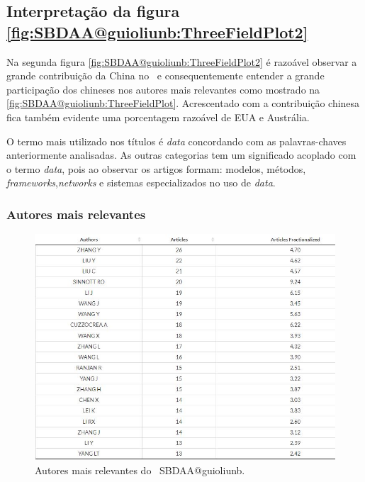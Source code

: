 \subsection{Interpretação da figura \ref{fig:SBDAA@guioliunb:ThreeFieldPlot2}}

Na segunda figura \ref{fig:SBDAA@guioliunb:ThreeFieldPlot2} é razoável  observar a grande contribuição da China no \dataset\ e consequentemente entender a grande participação dos chineses nos autores mais relevantes como mostrado na \ref{fig:SBDAA@guioliunb:ThreeFieldPlot}. Acrescentado com a contribuição chinesa fica também evidente uma porcentagem razoável de EUA e Austrália.

O termo mais utilizado nos títulos é \textit{data} concordando com as palavras-chaves anteriormente analisadas. As outras categorias tem um significado acoplado com o termo \textit{data}, pois ao observar os artigos formam: modelos, métodos, \textit{frameworks},\textit{networks} e sistemas especializados no uso de \textit{data}.


\subsubsection{Autores mais relevantes\label{MASSA:Sankey:AutoresRelevantes}}

\begin{figure}
    \centering
    \includegraphics[angle=0,width=1\textwidth]{experiments/guioliunb/AnaliseBibliometrica/SocialBigDataAnalysis/most relevant authors.png}
    \caption{Autores mais relevantes do \dataset\   SBDAA@guioliunb.}
    \label{fig:SBDAA@guioliunb:relevantauthors}
\end{figure}

